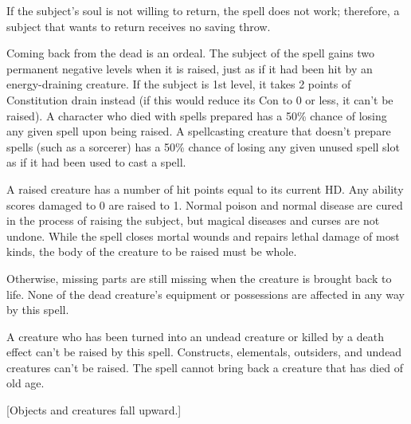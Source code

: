 {If the subject's soul is not willing to return, the spell does not work; therefore, a subject that wants to return receives no saving throw.

Coming back from the dead is an ordeal. The subject of the spell gains two permanent negative levels when it is raised, just as if it had been hit by an energy-draining creature. If the subject is 1st level, it takes 2 points of Constitution drain instead (if this would reduce its Con to 0 or less, it can't be raised). A character who died with spells prepared has a 50\% chance of losing any given spell upon being raised. A spellcasting creature that doesn't prepare spells (such as a sorcerer) has a 50\% chance of losing any given unused spell slot as if it had been used to cast a spell.

A raised creature has a number of hit points equal to its current HD. Any ability scores damaged to 0 are raised to 1. Normal poison and normal disease are cured in the process of raising the subject, but magical diseases and curses are not undone. While the spell closes mortal wounds and repairs lethal damage of most kinds, the body of the creature to be raised must be whole.

Otherwise, missing parts are still missing when the creature is brought back to life. None of the dead creature's equipment or possessions are affected in any way by this spell.

A creature who has been turned into an undead creature or killed by a death effect can't be raised by this spell. Constructs, elementals, outsiders, and undead creatures can't be raised. The spell cannot bring back a creature that has died of old age.}
        
[Objects and creatures fall upward.]
        

